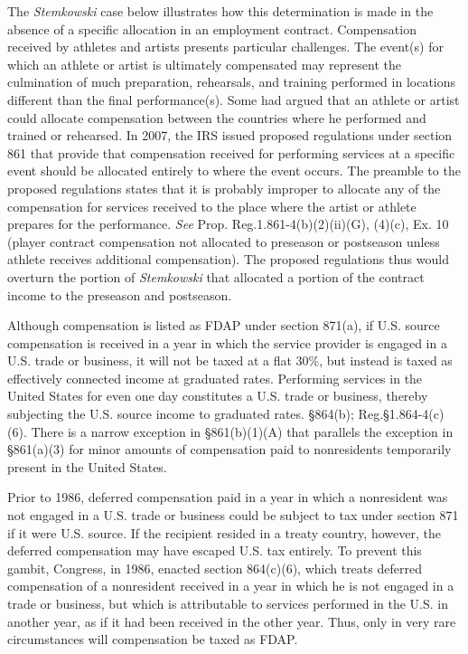 The \emph{Stemkowski} case below illustrates how this determination is made in the absence of a specific allocation in an employment contract.  Compensation received by athletes and artists presents particular challenges.  The event(s) for which an athlete or artist is ultimately compensated may represent the culmination of much preparation, rehearsals, and training performed in locations different than the final performance(s).  Some had argued that an athlete or artist could allocate compensation between the countries where he performed and trained or rehearsed.  In 2007, the IRS issued proposed regulations under section 861 that provide that compensation received for performing services at a specific event should be allocated entirely to where the event occurs.  The preamble to the proposed regulations states that it is probably improper to allocate any of the compensation for services received to the place where the artist or athlete prepares for the performance.  \emph{See} Prop. Reg.\@ 1.861-4(b)(2)(ii)(G), (4)(c), Ex. 10 (player contract compensation not allocated to preseason or postseason unless athlete receives additional compensation).  The proposed regulations thus would overturn the portion of \emph{Stemkowski} that allocated a portion of the contract income to the preseason and postseason.  

Although compensation is listed as FDAP under section 871(a), if U.S. source compensation is received in a year in which the service provider is engaged in a U.S. trade or business, it will not be taxed at a flat 30\%, but instead is taxed as effectively connected income at graduated rates.  Performing services in the United States for even one day constitutes a U.S. trade or business, thereby subjecting the U.S. source income to graduated rates.  \S 864(b); Reg.\@ \S 1.864-4(c)(6). There is a narrow exception in \S 861(b)(1)(A) that parallels the exception in \S861(a)(3) for minor amounts of compensation paid to nonresidents temporarily present in the United States.  

Prior to 1986, deferred compensation paid in a year in which a nonresident was not engaged in a U.S. trade or business could be subject to tax under section 871 if it were U.S. source.  If the recipient resided in a treaty country, however, the deferred compensation may have escaped U.S. tax entirely.  To prevent this gambit, Congress, in 1986, enacted section 864(c)(6), which treats deferred compensation of a nonresident received in a year in which he is not engaged in a trade or business, but which is attributable to services performed in the U.S. in another year, as if it had been received in the other year.  Thus, only in very rare circumstances will compensation be taxed as FDAP.    

